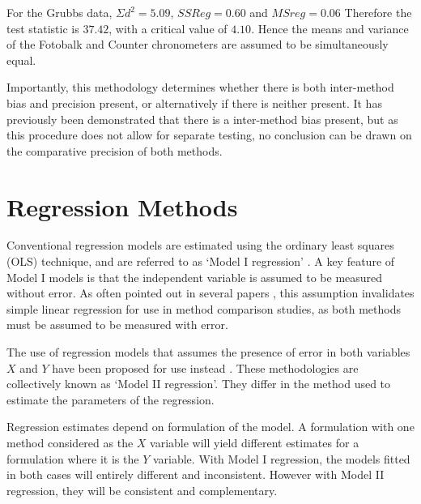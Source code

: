 \documentclass[12pt, a4paper]{report}
\theoremstyle{plain}
\theoremstyle{definition}
\theoremstyle{remark}
\begin{document}
For the Grubbs data, $\Sigma d^{2}=5.09 $, $SSReg = 0.60$ and
$MSreg=0.06$ Therefore the test statistic is $37.42$, with a
critical value of $4.10$. Hence the means and variance of the
Fotobalk and Counter chronometers are assumed to be simultaneously
equal.

Importantly, this methodology determines whether there is both
inter-method bias and precision present, or alternatively if there
is neither present. It has previously been demonstrated that there
is a inter-method bias present, but as this procedure does not
allow for separate testing, no conclusion can be drawn on the
comparative precision of both methods.





\section{Regression Methods}
Conventional regression models are estimated using the ordinary
least squares (OLS) technique, and are referred to as `Model I
regression' \citep{CornCoch,ludbrook97}. A key feature of Model I
models is that the independent variable is assumed to be measured
without error. As often pointed out in several papers
\citep{BA83,ludbrook97}, this assumption invalidates simple linear
regression for use in method comparison studies, as both methods
must be assumed to be measured with error.

The use of regression models that assumes the presence of error in
both variables $X$ and $Y$ have been proposed for use instead
\citep{CornCoch,ludbrook97}. These methodologies are collectively
known as `Model II regression'. They differ in the method used to
estimate the parameters of the regression.

Regression estimates depend on formulation of the model. A
formulation with one method considered as the $X$ variable will
yield different estimates for a formulation where it is the $Y$
variable. With Model I regression, the models fitted in both cases
will entirely different and inconsistent. However with Model II
regression, they will be consistent and complementary.
\end{document}
